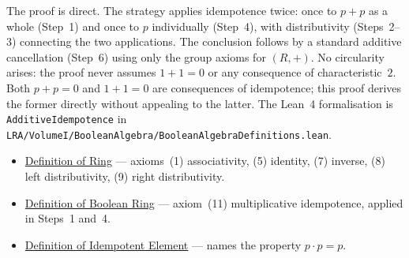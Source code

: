 \begin{remark*}
The proof is direct.
The strategy applies idempotence twice: once to $p + p$ as a
whole (Step~1) and once to $p$ individually (Step~4), with
distributivity (Steps~2--3) connecting the two applications.
The conclusion follows by a standard additive cancellation
(Step~6) using only the group axioms for $(R,+)$.
No circularity arises: the proof never assumes $1 + 1 = 0$
or any consequence of characteristic~$2$.
Both $p + p = 0$ and $1 + 1 = 0$ are consequences of
idempotence; this proof derives the former directly without
appealing to the latter.
The Lean~4 formalisation is \texttt{AdditiveIdempotence} in
\texttt{LRA/VolumeI/BooleanAlgebra/BooleanAlgebraDefinitions.lean}.
\end{remark*}

\begin{dependencies}
\begin{itemize}
  \item \hyperref[def:ring]{Definition of Ring}
        --- axioms~(1) associativity, (5) identity, (7) inverse,
        (8) left distributivity, (9) right distributivity.
  \item \hyperref[def:boolean-ring]{Definition of Boolean Ring}
        --- axiom~(11) multiplicative idempotence,
        applied in Steps~1 and~4.
  \item \hyperref[def:idempotent-element]{Definition of Idempotent Element}
        --- names the property $p \cdot p = p$.
\end{itemize}
\end{dependencies}

\clearpage
